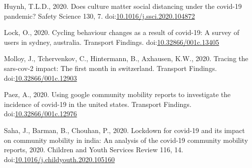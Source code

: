 \documentclass[]{elsarticle} %
\begin{document}
\leavevmode\hypertarget{ref-Huynh2020culture}{}%
Huynh, T.L.D., 2020. Does culture matter social distancing under the
covid-19 pandemic? Safety Science 130, 7.
doi:\href{https://doi.org/10.1016/j.ssci.2020.104872}{10.1016/j.ssci.2020.104872}

\leavevmode\hypertarget{ref-Lock2020cycling}{}%
Lock, O., 2020. Cycling behaviour changes as a result of covid-19: A
survey of users in sydney, australia. Transport Findings.
doi:\href{https://doi.org/10.32866/001c.13405}{10.32866/001c.13405}

\leavevmode\hypertarget{ref-Molloy2020tracing}{}%
Molloy, J., Tchervenkov, C., Hintermann, B., Axhausen, K.W., 2020.
Tracing the sars-cov-2 impact: The first month in switzerland. Transport
Findings.
doi:\href{https://doi.org/10.32866/001c.12903}{10.32866/001c.12903}

\leavevmode\hypertarget{ref-Paez2020using}{}%
Paez, A., 2020. Using google community mobility reports to investigate
the incidence of covid-19 in the united states. Transport Findings.
doi:\href{https://doi.org/10.32866/001c.12976}{10.32866/001c.12976}

\leavevmode\hypertarget{ref-Saha2020lockdown}{}%
Saha, J., Barman, B., Chouhan, P., 2020. Lockdown for covid-19 and its
impact on community mobility in india: An analysis of the covid-19
community mobility reports, 2020. Children and Youth Services Review
116, 14.
doi:\href{https://doi.org/10.1016/j.childyouth.2020.105160}{10.1016/j.childyouth.2020.105160}
\end{document}
